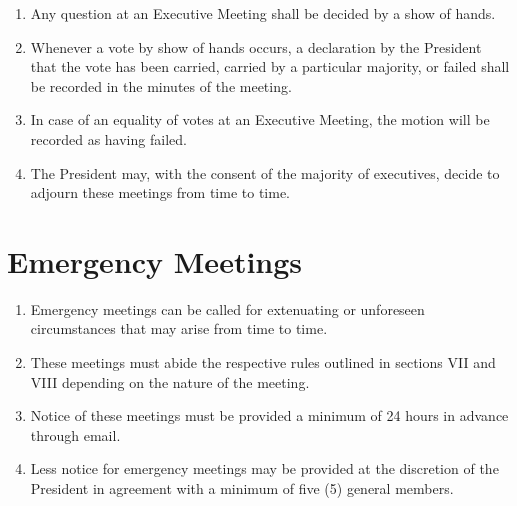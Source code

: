 \documentclass[12pt]{article}
\begin{document}
\begin{enumerate}[{8}.1]
    \item	Any question at an Executive Meeting shall be decided by a show of hands. 
    \item	Whenever a vote by show of hands occurs, a declaration by the President that the vote has been carried, carried by a particular majority, or failed shall be recorded in the minutes of the meeting.
    \item	In case of an equality of votes at an Executive Meeting, the motion will be recorded as having failed. 
    \item	The President may, with the consent of the majority of executives, decide to adjourn these meetings from time to time.
\end{enumerate}


\section{Emergency Meetings}
\begin{enumerate}[{9}.1]
    \item	Emergency meetings can be called for extenuating or unforeseen circumstances that may arise from time to time. 
    \item	These meetings must abide the respective rules outlined in sections VII and VIII depending on the nature of the meeting.
    \item	Notice of these meetings must be provided a minimum of 24 hours in advance through email. 
    \item	Less notice for emergency meetings may be provided at the discretion of the President in agreement with a minimum of five (5) general members. 
\end{enumerate}


\end{document}
